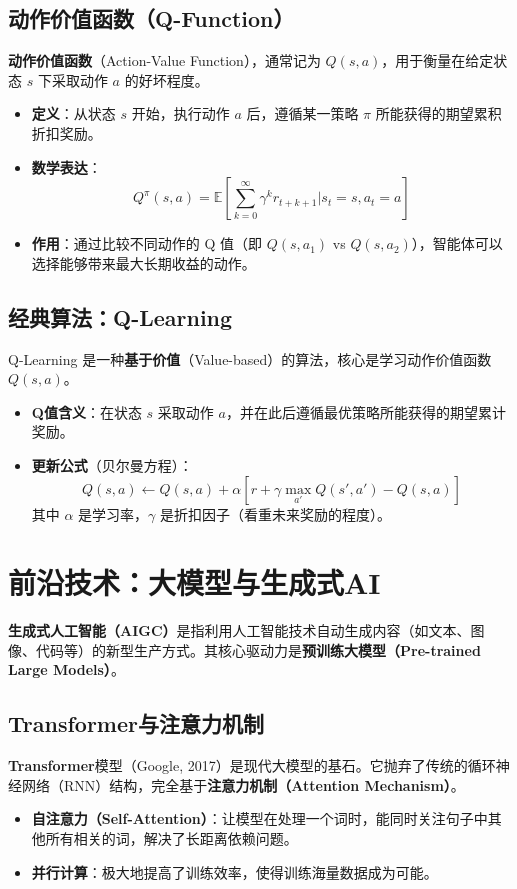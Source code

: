 \subsection{动作价值函数（Q-Function）}
\textbf{动作价值函数}（Action-Value Function），通常记为 $Q(s, a)$，用于衡量在给定状态 $s$ 下采取动作 $a$ 的好坏程度。
\begin{itemize}[leftmargin=2em,itemsep=0pt]
    \item \textbf{定义}：从状态 $s$ 开始，执行动作 $a$ 后，遵循某一策略 $\pi$ 所能获得的期望累积折扣奖励。
    \item \textbf{数学表达}：
    $$Q^\pi(s, a) = \mathbb{E} \left[ \sum_{k=0}^{\infty} \gamma^k r_{t+k+1} \bigg| s_t=s, a_t=a \right]$$
    \item \textbf{作用}：通过比较不同动作的 Q 值（即 $Q(s, a_1)$ vs $Q(s, a_2)$），智能体可以选择能够带来最大长期收益的动作。
\end{itemize}

\subsection{经典算法：Q-Learning}
Q-Learning 是一种\textbf{基于价值}（Value-based）的算法，核心是学习动作价值函数 $Q(s, a)$。
\begin{itemize}[leftmargin=2em,itemsep=0pt]
    \item \textbf{Q值含义}：在状态 $s$ 采取动作 $a$，并在此后遵循最优策略所能获得的期望累计奖励。
    \item \textbf{更新公式}（贝尔曼方程）：
    $$Q(s, a) \leftarrow Q(s, a) + \alpha [r + \gamma \max_{a'} Q(s', a') - Q(s, a)]$$
    其中 $\alpha$ 是学习率，$\gamma$ 是折扣因子（看重未来奖励的程度）。
\end{itemize}

\section{前沿技术：大模型与生成式AI}

\begin{conceptbox}
\textbf{生成式人工智能（AIGC）}是指利用人工智能技术自动生成内容（如文本、图像、代码等）的新型生产方式。其核心驱动力是\textbf{预训练大模型（Pre-trained Large Models）}。
\end{conceptbox}

\subsection{Transformer与注意力机制}
\textbf{Transformer}模型（Google, 2017）是现代大模型的基石。它抛弃了传统的循环神经网络（RNN）结构，完全基于\textbf{注意力机制（Attention Mechanism）}。
\begin{itemize}[leftmargin=2em,itemsep=0pt]
    \item \textbf{自注意力（Self-Attention）}：让模型在处理一个词时，能同时关注句子中其他所有相关的词，解决了长距离依赖问题。
    \item \textbf{并行计算}：极大地提高了训练效率，使得训练海量数据成为可能。
\end{itemize}


